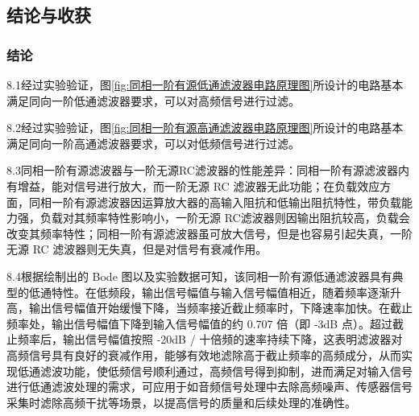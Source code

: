 \documentclass[./测控三级项目.tex]{subfiles} %
\begin{document}
	\subsection{结论与收获}
		\subsubsection{结论}
			8.1经过实验验证，图\ref{fig:同相一阶有源低通滤波器电路原理图}所设计的电路基本满足同向一阶低通滤波器要求，可以对高频信号进行过滤。\par
			8.2经过实验验证，图\ref{fig:同相一阶有源高通滤波器电路原理图}所设计的电路基本满足同向一阶高通滤波器要求，可以对低频信号进行过滤。\par
			8.3同相一阶有源滤波器与一阶无源RC滤波器的性能差异：同相一阶有源滤波器内有增益，能对信号进行放大，而一阶无源 RC 滤波器无此功能；在负载效应方面，同相一阶有源滤波器因运算放大器的高输入阻抗和低输出阻抗特性，带负载能力强，负载对其频率特性影响小，一阶无源 RC滤波器则因输出阻抗较高，负载会改变其频率特性；同相一阶有源滤波器虽可放大信号，但是也容易引起失真，一阶无源 RC 滤波器则无失真，但是对信号有衰减作用。\par
			8.4根据绘制出的 Bode 图以及实验数据可知，该同相一阶有源低通滤波器具有典型的低通特性。在低频段，输出信号幅值与输入信号幅值相近，随着频率逐渐升高，输出信号幅值开始缓慢下降，当频率接近截止频率时，下降速率加快。在截止频率处，输出信号幅值下降到输入信号幅值的约 0.707 倍（即 -3dB 点）。超过截止频率后，输出信号幅值按照 -20dB / 十倍频的速率持续下降，这表明滤波器对高频信号具有良好的衰减作用，能够有效地滤除高于截止频率的高频成分，从而实现低通滤波功能，使低频信号顺利通过，高频信号得到抑制，进而满足对输入信号进行低通滤波处理的需求，可应用于如音频信号处理中去除高频噪声、传感器信号采集时滤除高频干扰等场景，以提高信号的质量和后续处理的准确性。
\end{document}
